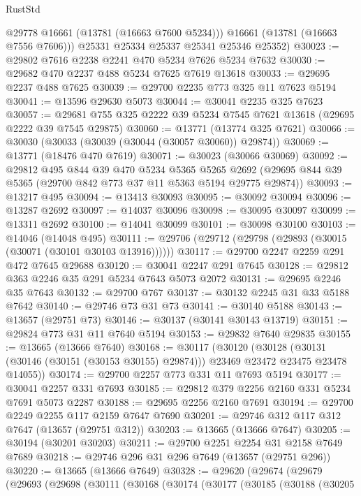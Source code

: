 \begin{lexlean}{RustStd}
\begin{coremodule}
          @29778
          @16661
          (@13781 (@16663 @7600 @5234)))
        @16661
        (@13781 (@16663 @7556 @7606)))
      @25331
      @25334
      @25337
      @25341
      @25346
      @25352)
@30023 := @29802 @7616 @2238 @2241 @470 @5234 @7626 @5234 @7632
@30030 := @29682 @470 @2237 @488 @5234 @7625 @7619 @13618
@30033 := @29695 @2237 @488 @7625
@30039 := @29700 @2235 @773 @325 @11 @7623 @5194
@30041 := @13596 @29630 @5073
@30044 := @30041 @2235 @325 @7623
@30057 := @29681 @755 @325 @2222 @39 @5234 @7545 @7621 @13618 (@29695 @2222 @39 @7545 @29875)
@30060 := @13771 (@13774 @325 @7621)
@30066 := @30030 (@30033 (@30039 (@30044 (@30057 @30060)) @29874))
@30069 := @13771 (@18476 @470 @7619)
@30071 := @30023 (@30066 @30069)
@30092 := @29812
    @495
    @844
    @39
    @470
    @5234
    @5365
    @5265
    @2692
    (@29695 @844 @39 @5365 (@29700 @842 @773 @37 @11 @5363 @5194 @29775 @29874))
@30093 := @13217 @495
@30094 := @13413 @30093
@30095 := @30092 @30094
@30096 := @13287 @2692
@30097 := @14037 @30096
@30098 := @30095 @30097
@30099 := @13311 @2692
@30100 := @14041 @30099
@30101 := @30098 @30100
@30103 := @14046 (@14048 @495)
@30111 := @29706 (@29712 (@29798 (@29893 (@30015 (@30071 (@30101 @30103 @13916))))))
@30117 := @29700 @2247 @2259 @291 @472 @7645 @29688
@30120 := @30041 @2247 @291 @7645
@30128 := @29812 @363 @2246 @35 @291 @5234 @7643 @5073 @2072
@30131 := @29695 @2246 @35 @7643
@30132 := @29700 @767
@30137 := @30132 @2245 @31 @33 @5188 @7642
@30140 := @29746 @73 @31 @73
@30141 := @30140 @5188
@30143 := @13657 (@29751 @73)
@30146 := @30137 (@30141 @30143 @13719)
@30151 := @29824 @773 @31 @11 @7640 @5194
@30153 := @29832 @7640 @29835
@30155 := @13665 (@13666 @7640)
@30168 := @30117
    (@30120
      (@30128 (@30131 (@30146 (@30151 (@30153 @30155) @29874))) @23469 @23472 @23475 @23478 @14055))
@30174 := @29700 @2257 @773 @331 @11 @7693 @5194
@30177 := @30041 @2257 @331 @7693
@30185 := @29812 @379 @2256 @2160 @331 @5234 @7691 @5073 @2287
@30188 := @29695 @2256 @2160 @7691
@30194 := @29700 @2249 @2255 @117 @2159 @7647 @7690
@30201 := @29746 @312 @117 @312 @7647 (@13657 (@29751 @312))
@30203 := @13665 (@13666 @7647)
@30205 := @30194 (@30201 @30203)
@30211 := @29700 @2251 @2254 @31 @2158 @7649 @7689
@30218 := @29746 @296 @31 @296 @7649 (@13657 (@29751 @296))
@30220 := @13665 (@13666 @7649)
@30328 := @29620
    (@29674
      (@29679
        (@29693
          (@29698
            (@30111
              (@30168
                (@30174
                  (@30177
                    (@30185
                      (@30188
                        (@30205

\end{coremodule}
\end{lexlean}
